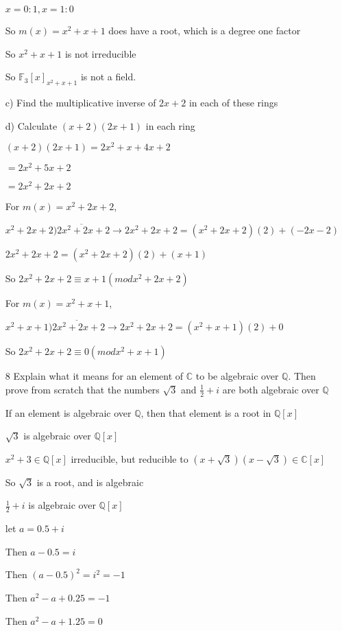 \documentclass[12pt]{article}
\begin{document}
\begin{itemize}
		$x = 0: 1, x = 1: 0$

		So $m(x) = x^2 + x + 1$ does have a root, which is a degree one factor

		So $x^2 + x + 1$ is not irreducible

		So $\mathbb{F}_3[x]_{x^2 + x + 1}$ is not a field.

		c) Find the multiplicative inverse of $2x +2$ in each of these rings

		d) Calculate $(x+2)(2x+1)$ in each ring

		$(x+2)(2x+1) = 2x^2 + x + 4x + 2$

		$= 2x^2 + 5x + 2$

		$= 2x^2 + 2x + 2$

		For $m(x) = x^2 + 2x + 2$,

		$x^2 + 2x + 2 \overline{)2x^2 + 2x + 2} \rightarrow 2x^2 + 2x + 2 = (x^2 + 2x + 2)(2) + (-2x - 2)$

		$2x^2 + 2x + 2 = (x^2 + 2x + 2)(2) + (x + 1)$

		So $2x^2 + 2x + 2 \equiv x+1 (mod x^2 + 2x + 2)$

		For $m(x) = x^2 + x + 1$,

		$x^2 + x + 1 \overline{)2x^2 + 2x + 2} \rightarrow 2x^2 + 2x + 2 = (x^2 + x + 1)(2) + 0$

		So $2x^2 + 2x + 2 \equiv 0 (mod x^2 + x + 1)$

	\item[8] Explain what it means for an element of $\mathbb{C}$ to be algebraic over $\mathbb{Q}$. Then prove from scratch that the numbers $\sqrt{3}$ and $\frac{1}{2} + i$ are both algebraic over $\mathbb{Q}$

		If an element is algebraic over $\mathbb{Q}$, then that element is a root in $\mathbb{Q}[x]$

		$\sqrt{3}$ is algebraic over $\mathbb{Q}[x]$

		$x^2 + 3 \in\mathbb{Q}[x]$ irreducible, but reducible to $(x + \sqrt{3})(x-\sqrt{3})\in\mathbb{C}[x]$

		So $\sqrt{3}$ is a root, and is algebraic

		$\frac{1}{2} + i$ is algebraic over $\mathbb{Q}[x]$

		let $a = 0.5 + i$

		Then $a - 0.5 = i$

		Then $(a - 0.5)^2 = i^2 = -1$

		Then $a^2 - a + 0.25 = -1$

		Then $a^2 - a + 1.25 = 0$


\end{itemize}
\end{document}

